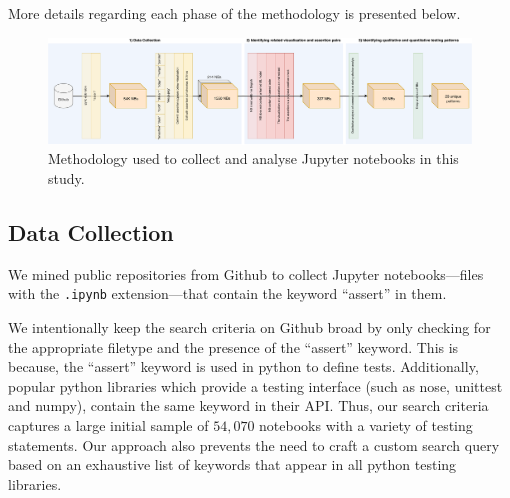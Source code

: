 \documentclass[acmsmall,screen,review,anonymous]{acmart}
\begin{document}
More details regarding each phase of the methodology is presented below.

\begin{figure}
  \centering
  \includegraphics[width=\textwidth]{method.pdf}
  \caption{Methodology used to collect and analyse Jupyter notebooks
    in this study.}
  \label{fig:method}
\end{figure}

\subsection{Data Collection}\label{sec:data-collect}

We mined public repositories from Github to collect Jupyter
notebooks---files with the \texttt{.ipynb} extension---that contain
the keyword ``assert'' in them.


We intentionally keep the search criteria on Github broad by only
checking for the appropriate filetype and the presence of the
``assert'' keyword. This is because, the ``assert'' keyword is used in
python to define tests. Additionally, popular python libraries which
provide a testing interface (such as nose, unittest and numpy),
contain the same keyword in their API. Thus, our search criteria
captures a large initial sample of $54,070$ notebooks with a variety
of testing statements. Our approach also prevents the need to craft a
custom search query based on an exhaustive list of keywords that
appear in all python testing libraries.
\end{document}
